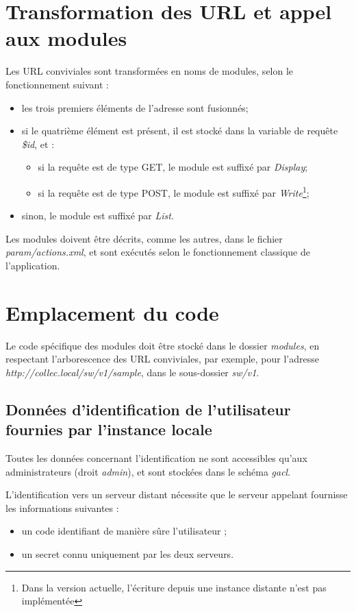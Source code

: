 \section{Transformation des URL et appel aux modules}
Les URL conviviales sont transformées en noms de modules, selon le fonctionnement suivant :
\begin{itemize}
\item les trois premiers éléments de l'adresse sont fusionnés;
\item si le quatrième élément est présent, il est stocké dans la variable de requête \textit{\$id}, et :
\begin{itemize}
\item si la requête est de type GET, le module est suffixé par \textit{Display};
\item si la requête est de type POST, le module est suffixé par \textit{Write}\footnote{Dans la version actuelle, l'écriture depuis une instance distante n'est pas implémentée};
\end{itemize}
\item sinon, le module est suffixé par \textit{List}.
\end{itemize}

Les modules doivent être décrits, comme les autres, dans le fichier \textit{param/actions.xml}, et sont exécutés selon le fonctionnement classique de l'application.

\section{Emplacement du code}
Le code spécifique des modules doit être stocké dans le dossier \textit{modules}, en respectant l'arborescence des URL conviviales, par exemple, pour l'adresse \textit{http://collec.local/sw/v1/sample}, dans le sous-dossier \textit{sw/v1}.

\subsection{Données d'identification de l'utilisateur fournies par l'instance locale}
\label{table_user}

Toutes les données concernant l'identification ne sont accessibles qu'aux administrateurs (droit \textit{admin}), et sont stockées dans le schéma \textit{gacl}.

L'identification vers un serveur distant nécessite que le serveur appelant fournisse les informations suivantes :
\begin{itemize}
\item un code identifiant de manière sûre l'utilisateur ;
\item un secret connu uniquement par les deux serveurs.
\end{itemize}

